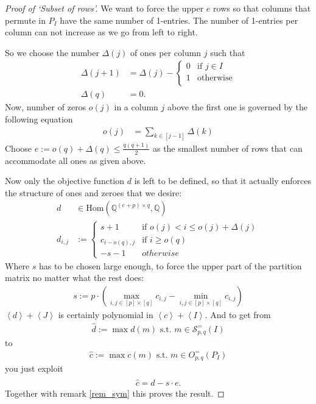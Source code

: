 \documentclass[a4paper]{amsart}
\theoremstyle{lemma}
\theoremstyle{definition}
\theoremstyle{remark}
\theoremstyle{example}
\newcommand{\lr}[1]{\ensuremath{\left( #1 \right)}}
\newcommand{\lrE}[1]{\ensuremath{\left[ #1 \right]}}
\newcommand{\lrX}[1]{\ensuremath{\left< #1 \right>}}
\newcommand{\rationals}{\ensuremath{\mathbb{Q}}}
\newcommand{\Hom}{\ensuremath{\mathrm{Hom}}}
\begin{document}
\begin{proof}[Proof of `Subset of rows']
  We want to force the upper \(e\) rows so that columns that permute
  in \(P_I\) have the same number of 1-entries.  The number of
  1-entries per column can not increase as we go from left to
  right.

  So we choose the number \(\Delta\lr{j}\) of ones per column \(j\) such that
  \begin{align}
    \Delta \lr{j+1} & =  \Delta \lr{j} - \begin{cases} 0 & \text{if } j \in I\\
      1 & \text{otherwise} \\
    \end{cases}\\
    \Delta \lr{q} & = 0 \text{.}
  \end{align}
  Now, number of zeros \(o\lr{j}\) in a column \(j\) above the first one is governed by the following equation
  \begin{align}
    o \lr{j} & = \sum_{k \in \lrE{j-1}} \Delta \lr{k}
  \end{align}
  Choose \(e := o\lr{q} + \Delta\lr{q} \leq \frac{q \lr{q+1}}{2}\) as
  the smallest number of rows that can accommodate all ones as given
  above.
 
  Now only the objective function \(d\) is left to be defined, so that it
  actually enforces the structure of ones and zeroes that we desire:
  \begin{align}
    d & \in \Hom \lr{\rationals^{\lr{e + p} \times q}, \rationals} \\
    \nonumber
    d_{i,j} & := \begin{cases} s+1 & \text{if } o\lr{j} < i \leq o\lr{j}+\Delta\lr{j}\\
      c_{i-o\lr{q},j} & \text{if } i \geq o\lr{q}\\
      -s-1 & otherwise
    \end{cases}
  \end{align}
  Where \(s\) has to be chosen large enough, to force the upper part of
  the partition matrix no matter what the rest does:
  \begin{align}
    s := p \cdot \lr{\max_{i,j \in \lrE{p}\times \lrE{q}} c_{i,j}
      - \min_{i,j \in \lrE{p}\times \lrE{q}} c_{i,j}}
  \end{align}
  \(\lrX{d}+\lrX{J}\) is certainly polynomial in \(\lrX{c} + \lrX{I}\).  And to get from
  \begin{align}
    \hat{d} := \max d \lr{m} \text{ s.t. } m \in \mathcal{S}^=_{p, q}\lr{I}
  \end{align}
  to
  \begin{align}
    \hat{c} := \max c \lr{m} \text{ s.t. } m \in O^=_{p, q} \lr{P_I}
  \end{align}
  you just exploit
  \begin{align}
    \hat{c} = \hat{d} - s \cdot e \text{.}
  \end{align}
  Together with remark \ref{rem_sym} this proves the result.
\end{proof}



\end{document}
